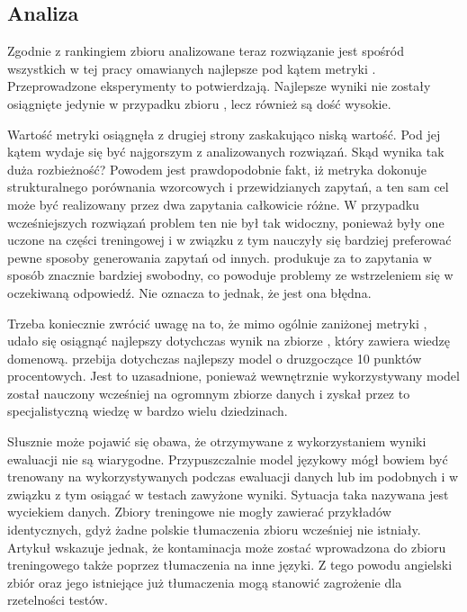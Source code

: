 \subsection{Analiza}
Zgodnie z rankingiem zbioru  analizowane teraz rozwiązanie jest spośród wszystkich w tej pracy omawianych najlepsze pod kątem metryki . Przeprowadzone eksperymenty to potwierdzają. Najlepsze wyniki nie zostały osiągnięte jedynie w przypadku zbioru , lecz również są dość wysokie.

Wartość metryki  osiągnęła z drugiej strony zaskakująco niską wartość. Pod jej kątem  wydaje się być najgorszym z analizowanych rozwiązań. Skąd wynika tak duża rozbieżność? Powodem jest prawdopodobnie fakt, iż metryka  dokonuje strukturalnego porównania wzorcowych i przewidzianych  zapytań, a ten sam cel może być realizowany przez dwa zapytania całkowicie różne. W przypadku wcześniejszych rozwiązań problem ten nie był tak widoczny, ponieważ były one uczone na części treningowej i w związku z tym nauczyły się bardziej preferować pewne sposoby generowania zapytań od innych.  produkuje za to zapytania w sposób znacznie bardziej swobodny, co powoduje problemy ze wstrzeleniem się w oczekiwaną odpowiedź. Nie oznacza to jednak, że jest ona błędna. 

Trzeba koniecznie zwrócić uwagę na to, że mimo ogólnie zaniżonej metryki , udało się osiągnąć najlepszy dotychczas wynik na zbiorze , który zawiera wiedzę domenową.  przebija dotychczas najlepszy model  o druzgoczące 10 punktów procentowych. Jest to uzasadnione, ponieważ wewnętrznie wykorzystywany model  został nauczony wcześniej na ogromnym zbiorze danych i zyskał przez to specjalistyczną wiedzę w bardzo wielu dziedzinach.

Słusznie może pojawić się obawa, że otrzymywane z wykorzystaniem  wyniki ewaluacji nie są wiarygodne. Przypuszczalnie model językowy  mógł bowiem być trenowany na wykorzystywanych podczas ewaluacji danych lub im podobnych i w związku z tym osiągać w testach zawyżone wyniki. Sytuacja taka nazywana jest wyciekiem danych. Zbiory treningowe nie mogły zawierać przykładów identycznych, gdyż żadne polskie tłumaczenia zbioru  wcześniej nie istniały. Artykuł   wskazuje jednak, że kontaminacja może zostać wprowadzona do zbioru treningowego także poprzez tłumaczenia na inne języki. Z tego powodu angielski zbiór  oraz jego istniejące już tłumaczenia mogą stanowić zagrożenie dla rzetelności testów.


